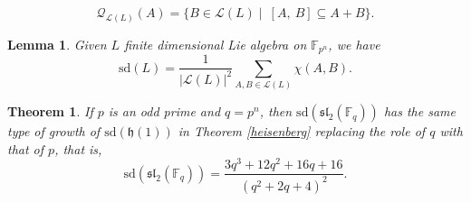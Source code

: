 \documentclass[10pt,a4paper]{amsart}
\newtheorem{theorem}{Theorem}
\newtheorem{lemma}{Lemma}
\begin{document}
\begin{equation} \label{permutewithA}
        \mathcal{Q}_{\mathcal{L}(L)}(A) =\{B \in \mathcal{L}  (L)  \mid  \ [A, \  B] \subseteq A+B \}. 
\end{equation}

\begin{lemma}\label{combinatorialformulat} Given $L$ finite dimensional Lie algebra on $\mathbb{F}_{p^n}$, we have
\[\label{sdviacharfun}
    \mathrm{sd}(L)=\frac{1}{|\mathcal{L}(L)|^2} \underset{A, B\in \mathcal{L}(L) }{\sum} \chi (A,B).
\]    
\end{lemma}

\begin{theorem} \label{sdforsl2}
 If $p$ is an odd prime and $q=p^n$, then $\mathrm{sd}(\mathfrak{sl}_2(\mathbb{F}_q))$ has the same type of growth of $\mathrm{sd}(\mathfrak{h}(1))$ in Theorem \ref{heisenberg} replacing the role of $q$ with that of $p$, that is,   $$\mathrm{sd}(\mathfrak{sl}_2(\mathbb{F}_q))=\frac{3q^3+12q^2+16q+16}{{(q^2+2q+4)^2}}.$$
\end{theorem}
\end{document}
